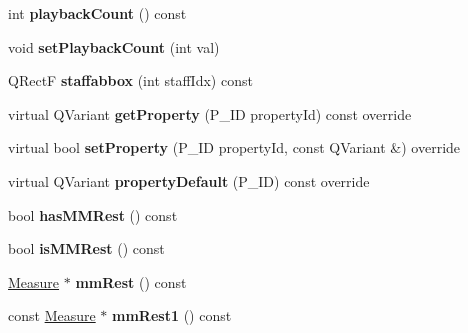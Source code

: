 \begin{DoxyCompactItemize}
\item 
\mbox{\label{class_ms_1_1_measure_a56e234503204d1e2883f8cd5512caa80}} 
int {\bfseries playback\+Count} () const
\item 
\mbox{\label{class_ms_1_1_measure_a15c2378b02793c2f8aab221559124fd3}} 
void {\bfseries set\+Playback\+Count} (int val)
\item 
\mbox{\label{class_ms_1_1_measure_af1e8fd79a9de3d2e12bbda91e1a82aff}} 
Q\+RectF {\bfseries staffabbox} (int staff\+Idx) const
\item 
\mbox{\label{class_ms_1_1_measure_a2c4d286994dfcf13358e10d79698ce44}} 
virtual Q\+Variant {\bfseries get\+Property} (P\+\_\+\+ID property\+Id) const override
\item 
\mbox{\label{class_ms_1_1_measure_a92b4f7e43c5b1874472cdbae8be705ab}} 
virtual bool {\bfseries set\+Property} (P\+\_\+\+ID property\+Id, const Q\+Variant \&) override
\item 
\mbox{\label{class_ms_1_1_measure_ad03abc5256c12b54f3579c9a535558bf}} 
virtual Q\+Variant {\bfseries property\+Default} (P\+\_\+\+ID) const override
\item 
\mbox{\label{class_ms_1_1_measure_a9491f66d4e4c82e05aaea063d3654ac8}} 
bool {\bfseries has\+M\+M\+Rest} () const
\item 
\mbox{\label{class_ms_1_1_measure_ae92cfe704a9477074d0fbe1a3bb6ff61}} 
bool {\bfseries is\+M\+M\+Rest} () const
\item 
\mbox{\label{class_ms_1_1_measure_a9109c2c9621f0cc9ecd86afcae54afe8}} 
\hyperlink{class_ms_1_1_measure}{Measure} $\ast$ {\bfseries mm\+Rest} () const
\item 
\mbox{\label{class_ms_1_1_measure_a7dd90eaf72439bf012349d7e8f476425}} 
const \hyperlink{class_ms_1_1_measure}{Measure} $\ast$ {\bfseries mm\+Rest1} () const
\item 
\mbox{\label{class_ms_1_1_measure_a4f69d0d7b4406aeff800488d2dd06d97}} 

\end{DoxyCompactItemize}
